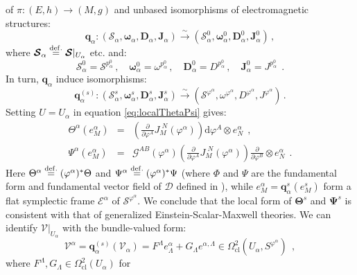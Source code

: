 \documentclass[10pt, cmp, numbook, final, a4paper]{svjour}
\newcommand*{\SavedEqref}{}
\let\SavedEqref\eqref
\renewcommand*{\eqref}[1]{%
  \begingroup
    \hypersetup{
      linkcolor=blue,
      linkbordercolor=blue,
    }%
    \SavedEqref{#1}%
  \endgroup
}
\newcommand{\eqdef}{\stackrel{{\rm def.}}{=}}
\def\bD{\mathbb{D}}
\def\dd{\mathrm{d}}
\def\bJ{\mathbf{J}}
\def\bomega{\boldsymbol{\omega}}
\def\bJ{\mathbf{J}}
\def\bTheta{\mathbf{\Theta}}
\def\bPsi{\mathbf{\Psi}}
\def\cD{\mathcal{D}}
\def\cE{\check{E}}
\def\cG{\mathcal{G}}
\def\cS{\mathcal{S}}
\def\cV{\mathcal{V}}
\def\cE{\mathcal{E}}
\def\bD{\mathbf{D}}
\def\bomega{\boldsymbol{\omega}}
\def\bcS{\boldsymbol{\mathcal{S}}}
\def\bD{\mathbf{D}}
\def\mq{\mathbf{q}}
\def\bcV{\boldsymbol{\cV}}
\def\cl{\mathrm{cl}}
\begin{document}
of $\pi\colon (E,h)\to (M,g)$ and unbased isomorphisms of electromagnetic structures:
\begin{equation*}
\mq_{\alpha}\colon (\bcS_{\alpha},\bomega_{\alpha},\bD_{\alpha},\bJ_{\alpha})\stackrel{\sim}{\rightarrow}  (\bcS^{0}_{\alpha},\bomega^{0}_{\alpha},\bD^{0}_{\alpha},\bJ^{0}_{\alpha})\, ,
\end{equation*}
where $\bcS_{\alpha}\eqdef \bcS|_{U_\alpha}$ etc. and:
\begin{equation*}
\bcS^{0}_{\alpha} = \cS^{p^{0}_{\alpha}}\, , \quad \bomega^{0}_{\alpha} = \omega^{p^{0}_{\alpha}}\, , \quad \bD^{0}_{\alpha} = D^{p^{0}_{\alpha}}\, , \quad \bJ^{0}_{\alpha} = J^{p^{0}_{\alpha}}~~.
\end{equation*}
In turn, $\mq_\alpha$ induce isomorphisms:
\begin{equation*}
\mq_\alpha^{(s)}:(\bcS_\alpha^s, \bomega_\alpha^s, \bD_\alpha^s,
\bJ_\alpha^s)\stackrel{\sim}{\rightarrow} (\cS^{\varphi^{\alpha}},
\omega^{\varphi^{\alpha}}, D^{\varphi^{\alpha}},
J^{\varphi^{\alpha}})\, .
\end{equation*}
Setting $U=U_\alpha$ in equation \eqref{eq:localThetaPsi} gives:
\begin{eqnarray}
\label{eq:localThetaPsiII}
\Theta^{\alpha}(e^{\alpha}_{M}) &=& \left(\frac{\partial}{\partial \varphi^{A}} J_{M}^{\,\, N}(\varphi^{\alpha})\right) \dd\varphi^{A} \otimes e^{\alpha}_{N}~~, \nonumber\\ 
\Psi^{\alpha}(e^{\alpha}_{M}) &=& \cG^{AB}(\varphi^{\alpha}) \left(\frac{\partial}{\partial \varphi^{A}} J_{M}^{\,\, N}(\varphi^{\alpha})\right) \frac{\partial}{\partial \varphi^{B}} \otimes e^{\alpha}_{N}~~.
\end{eqnarray}
Here $\Theta^{\alpha} \eqdef (\varphi^{\alpha})^{\ast} \Theta$ and
$\Psi^{\alpha} \eqdef (\varphi^{\alpha})^{\ast} \Psi$ (where $\Phi$
and $\Psi$ are the fundamental form and fundamental vector field of
$\cD$ defined in \cite{GESM}), while $e^{\alpha}_{M} =
\mq^{s}_{\alpha}(e^{s}_{M})$ form a flat symplectic frame $\cE^\alpha$
of $\cS^{\varphi^\alpha}$. We conclude that the local form of
$\bTheta^{s}$ and $\bPsi^{s}$ is consistent with that of generalized
Einstein-Scalar-Maxwell theories. We can identify $\bcV|_{U_\alpha}$
with the bundle-valued form:
\begin{equation*}
\cV^{\alpha} = \mq^{(s)}_{\alpha}(\bcV_{\alpha}) = F^{\Lambda} e^{\alpha}_{\Lambda} + G_{\Lambda} e^{\alpha, \Lambda} \in
\Omega^{2}_{\cl}(U_{\alpha},S^{\varphi^{\alpha}})~~,
\end{equation*}
where $F^{\Lambda}, G_{\Lambda} \in \Omega^{2}_{\cl}(U_{\alpha})$ for
\end{document}
